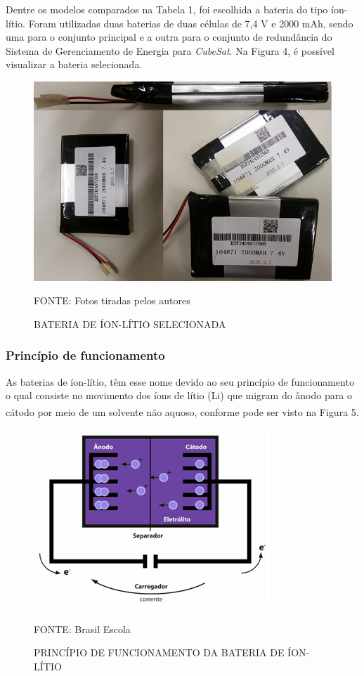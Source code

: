 \documentclass[
	12pt,				%
	openright,			%
	oneside,			%
	a4paper,			%
	english,			%
	french,				%
	spanish,			%
	brazil,				%
	oldfontcommands
	]{abntex2}
\begin{document}
	Dentre os modelos comparados na Tabela 1, foi escolhida a bateria do tipo íon-lítio. Foram utilizadas duas baterias de duas células de 7,4 V e 2000 mAh, sendo uma para o conjunto principal e a outra para o conjunto de redundância do Sistema de Gerenciamento de Energia para \textit{CubeSat}. Na Figura 4, é possível visualizar a bateria selecionada.
	
	\begin{figure}[th]
		\caption{BATERIA DE ÍON-LÍTIO SELECIONADA}
		\centering
		\includegraphics[width=0.6\linewidth]{./figs/cubesat_04}
			
		\begin{small}
			FONTE: Fotos tiradas pelos autores
		\end{small}
	\end{figure}
	
\subsubsection[Princípio de funcionamento]{Princípio de funcionamento}
	
	As baterias de íon-lítio, têm esse nome devido ao seu princípio de funcionamento o qual consiste no movimento dos íons de lítio (Li) que migram do ânodo para o cátodo por meio de um solvente não aquoso, conforme pode ser visto na Figura 5.\textsuperscript{\cite{BraEsc}}
	
	\begin{figure}[th]
		\caption{PRINCÍPIO DE FUNCIONAMENTO DA BATERIA DE ÍON-LÍTIO}
		\centering
		\includegraphics[width=0.6\linewidth]{./figs/cubesat_05}
			
		\begin{small}
			FONTE: Brasil Escola\textsuperscript{\cite{BraEsc}}
		\end{small}		
	\end{figure}
\end{document}
